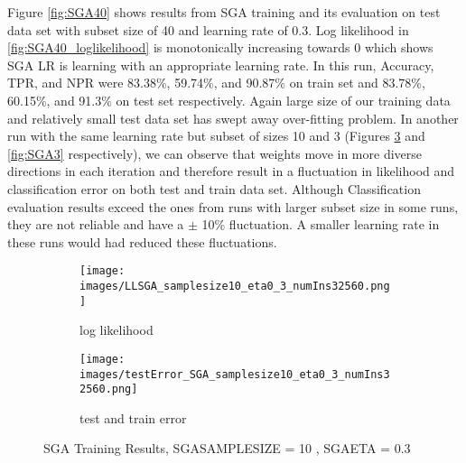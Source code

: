 \documentclass[a4paper,11pt]{article}
\begin{document}
Figure \ref{fig:SGA40} shows results from SGA training and its evaluation on test data set with subset size of 40 and learning rate of 0.3. Log likelihood in \ref{fig:SGA40_loglikelihood} is monotonically increasing towards 0 which shows SGA LR is learning with an appropriate learning rate. In this run, Accuracy, TPR, and NPR were 83.38\%, 59.74\%, and 90.87\% on train set and 83.78\%, 60.15\%, and 91.3\% on test set respectively. Again large size of our training data and relatively small test data set has swept away over-fitting problem. In another run with the same learning rate but subset of sizes 10 and 3 (Figures \ref{fig:SGA10} and \ref{fig:SGA3} respectively), we can observe that weights move in more diverse directions in each iteration and therefore result in a fluctuation in likelihood and classification error on both test and train data set. Although Classification evaluation results exceed the ones from runs with larger subset size in some runs, they are not reliable and have a $\pm$ 10\% fluctuation. A smaller learning rate in these runs would had reduced these fluctuations.

\begin{figure}[t]

\begin{subfigure}{.5\textwidth}

  \texttt{[image: images/LLSGA\_samplesize10\_eta0\_3\_numIns32560.png]}
	\centering
  \caption{log likelihood }
  \label{fig:SGA10_loglikelihood}
\end{subfigure}
\begin{subfigure}{.5\textwidth}

  \texttt{[image: images/testError\_SGA\_samplesize10\_eta0\_3\_numIns32560.png]}
	\centering
  \caption{test and train error }
  \label{fig:SGA10_errors}
\end{subfigure}

  \caption{SGA Training Results, SGA\underline{\hspace{.2cm}}SAMPLE\underline{\hspace{.2cm}}SIZE = 10 , SGA\underline{\hspace{.2cm}}ETA = 0.3}
  \label{fig:SGA10}
\end{figure}
\end{document}
